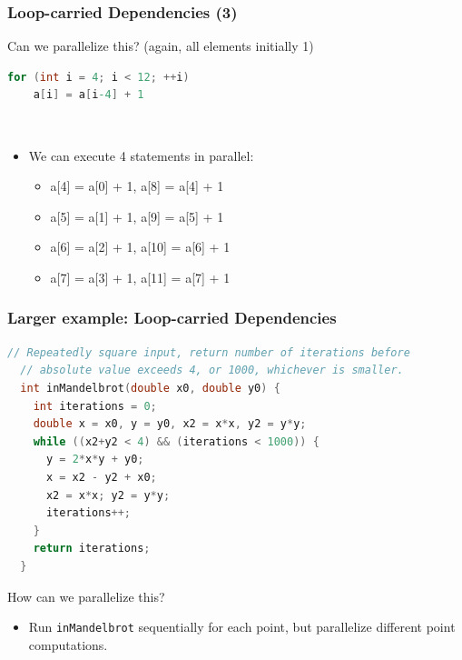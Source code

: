 \begin{frame}[fragile]
\frametitle{Loop-carried Dependencies (3)}

Can we parallelize this? (again, all elements initially 1)
\begin{lstlisting}[language=C]
for (int i = 4; i < 12; ++i)
    a[i] = a[i-4] + 1
\end{lstlisting}
\pause
{}\\[1em]
\begin{itemize}
\item We can execute 4 statements in parallel:
\begin{itemize}
  \item a[4] = a[0] + 1, a[8] = a[4] + 1
  \item a[5] = a[1] + 1, a[9] = a[5] + 1
  \item a[6] = a[2] + 1, a[10] = a[6] + 1
  \item a[7] = a[3] + 1, a[11] = a[7] + 1
\end{itemize}  
\end{itemize}

\pause
{}

\end{frame}

\begin{frame}[fragile]
\frametitle{Larger example: Loop-carried Dependencies}
{\small \begin{lstlisting}[language=C]
  // Repeatedly square input, return number of iterations before 
  // absolute value exceeds 4, or 1000, whichever is smaller.
  int inMandelbrot(double x0, double y0) {
    int iterations = 0;
    double x = x0, y = y0, x2 = x*x, y2 = y*y;
    while ((x2+y2 < 4) && (iterations < 1000)) {
      y = 2*x*y + y0;
      x = x2 - y2 + x0;
      x2 = x*x; y2 = y*y;
      iterations++;
    }
    return iterations;
  }
\end{lstlisting} 
}
How can we parallelize this? \\
\pause
\begin{itemize}
\item Run {\tt inMandelbrot} sequentially for each point, but parallelize
different point computations.
\end{itemize}
\end{frame}

